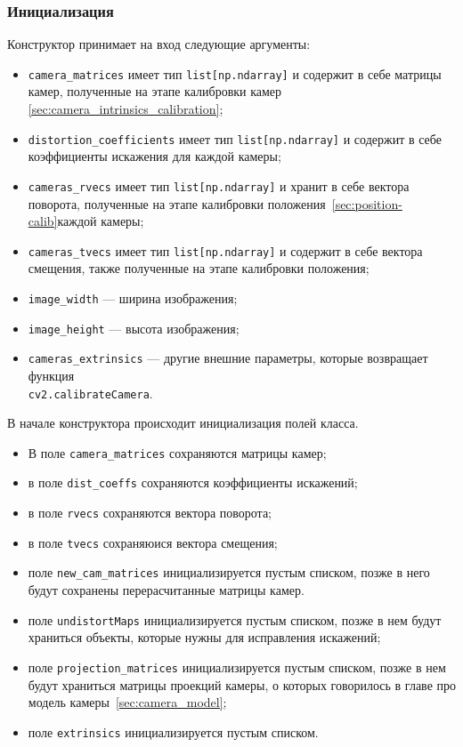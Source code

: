 \documentclass[12pt, a4paper]{article}
\begin{document}
\subsubsection{Инициализация}
Конструктор принимает на вход следующие аргументы:
\begin{itemize}
  \item \texttt{camera\_matrices} имеет тип \texttt{list[np.ndarray]} и
    содержит в себе матрицы камер, полученные на этапе калибровки камер
    \ref{sec:camera_intrinsics_calibration};
  \item \texttt{distortion\_coefficients} имеет тип \texttt{list[np.ndarray]} и содержит
    в себе коэффициенты искажения для каждой камеры;
  \item \texttt{cameras\_rvecs} имеет тип \texttt{list[np.ndarray]} и хранит в
    себе вектора поворота, полученные на этапе калибровки
    положения~\ref{sec:position-calib}каждой камеры;
  \item \texttt{cameras\_tvecs} имеет тип \texttt{list[np.ndarray]} и содержит
    в себе вектора смещения, также полученные на этапе калибровки положения;
  \item \texttt{image\_width} --- ширина изображения;
  \item \texttt{image\_height} --- высота изображения;
  \item \texttt{cameras\_extrinsics} --- другие внешние параметры, которые
    возвращает функция \\\texttt{cv2.calibrateCamera}.
\end{itemize}

В начале конструктора происходит инициализация полей класса.
\begin{itemize}
  \item В поле \texttt{camera\_matrices} сохраняются матрицы камер;
  \item в поле \texttt{dist\_coeffs} сохраняются коэффициенты искажений;
  \item в поле \texttt{rvecs} сохраняются вектора поворота;
  \item в поле \texttt{tvecs} сохраняюися вектора смещения; 
  \item поле \texttt{new\_cam\_matrices} инициализируется пустым списком, позже в
    него будут сохранены перерасчитанные матрицы камер.
  \item поле \texttt{undistortMaps} инициализируется пустым списком, позже в
    нем будут храниться объекты, которые нужны для исправления искажений;
  \item поле \texttt{projection\_matrices} инициализируется пустым списком,
    позже в нем будут храниться матрицы проекций камеры, о которых говорилось в
    главе про модель камеры~\ref{sec:camera_model};
  \item поле \texttt{extrinsics} инициализируется пустым списком.
\end{itemize}
\end{document}

